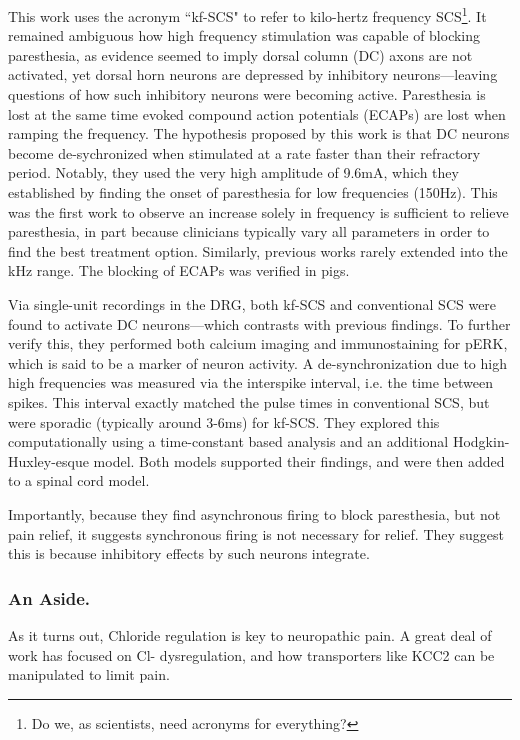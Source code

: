 This work uses the acronym ``kf-SCS" to refer to kilo-hertz frequency SCS\footnote{Do we, as scientists, need acronyms for everything?}. It remained ambiguous how high frequency stimulation was capable of blocking paresthesia, as evidence seemed to imply dorsal column (DC) axons are not activated, yet dorsal horn neurons are depressed by inhibitory neurons---leaving questions of how such inhibitory neurons were becoming active. Paresthesia is lost at the same time evoked compound action potentials (ECAPs) are lost when ramping the frequency. The hypothesis proposed by this work is that DC neurons become de-sychronized when stimulated at a rate faster than their refractory period. Notably, they used the very high amplitude of 9.6mA, which they established by finding the onset of paresthesia for low frequencies (150Hz). This was the first work to observe an increase solely in frequency is sufficient to relieve paresthesia, in part because clinicians typically vary all parameters in order to find the best treatment option. Similarly, previous works rarely extended into the kHz range. The blocking of ECAPs was verified in pigs.\newline

Via single-unit recordings in the DRG, both kf-SCS and conventional SCS were found to activate DC neurons---which contrasts with previous findings. To further verify this, they performed both calcium imaging and immunostaining for pERK, which is said to be a marker of neuron activity. A de-synchronization due to high high frequencies was measured via the interspike interval, i.e. the time between spikes. This interval exactly matched the pulse times in conventional SCS, but were sporadic (typically around 3-6ms) for kf-SCS. They explored this computationally using a time-constant based analysis and an additional Hodgkin-Huxley-esque model. Both models supported their findings, and were then added to a spinal cord model.\newline

Importantly, because they find asynchronous firing to block paresthesia, but not pain relief, it suggests synchronous firing is not necessary for relief. They suggest this is because inhibitory effects by such neurons integrate.

\subsubsection{An Aside.}

As it turns out, Chloride regulation is key to neuropathic pain. A great deal of work has focused on Cl- dysregulation, and how transporters like KCC2 can be manipulated to limit pain. 


